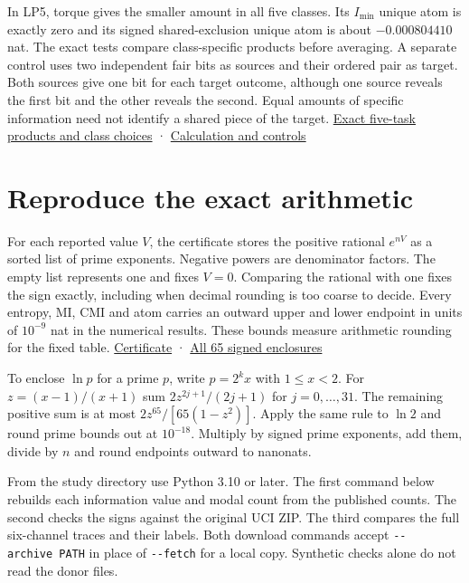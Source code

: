 In LP5, torque gives the smaller amount in all five classes. Its \(I_{\min}\) unique atom is exactly zero and its signed shared-exclusion unique atom is about \(-0.000804410\) nat. The exact tests compare class-specific products before averaging. A separate control uses two independent fair bits as sources and their ordered pair as target. Both sources give one bit for each target outcome, although one source reveals the first bit and the other reveals the second. Equal amounts of specific information need not identify a shared piece of the target. \href{https://github.com/sepahead/pid-rs/blob/main/audit/research/robot-wrist-slope-signs/imin-comparison.json}{Exact five-task products and class choices} · \href{https://github.com/sepahead/pid-rs/blob/main/audit/research/robot-wrist-slope-signs/compare_imin.py}{Calculation and controls}

\clearpage

\section{Reproduce the exact arithmetic}\label{reproduce-the-exact-arithmetic}

For each reported value \(V\), the certificate stores the positive rational \(e^{nV}\) as a sorted list of prime exponents. Negative powers are denominator factors. The empty list represents one and fixes \(V=0\). Comparing the rational with one fixes the sign exactly, including when decimal rounding is too coarse to decide. Every entropy, MI, CMI and atom carries an outward upper and lower endpoint in units of \(10^{-9}\) nat in the numerical results. These bounds measure arithmetic rounding for the fixed table. \href{https://github.com/sepahead/pid-rs/blob/main/audit/research/robot-wrist-slope-signs/certificate.json}{Certificate} · \href{https://github.com/sepahead/pid-rs/blob/main/audit/research/robot-wrist-slope-signs/results.json}{All 65 signed enclosures}

To enclose \(\ln p\) for a prime \(p\), write \(p=2^k x\) with \(1\le x<2\). For \(z=(x-1)/(x+1)\) sum \(2z^{2j+1}/(2j+1)\) for \(j=0,\ldots,31\). The remaining positive sum is at most \(2z^{65}/[65(1-z^2)]\). Apply the same rule to \(\ln 2\) and round prime bounds out at \(10^{-18}\). Multiply by signed prime exponents, add them, divide by \(n\) and round endpoints outward to nanonats.

From the study directory use Python 3.10 or later. The first command below rebuilds each information value and modal count from the published counts. The second checks the signs against the original UCI ZIP. The third compares the full six-channel traces and their labels. Both download commands accept \texttt{-\/-archive\ PATH} in place of \texttt{-\/-fetch} for a local copy. Synthetic checks alone do not read the donor files.

